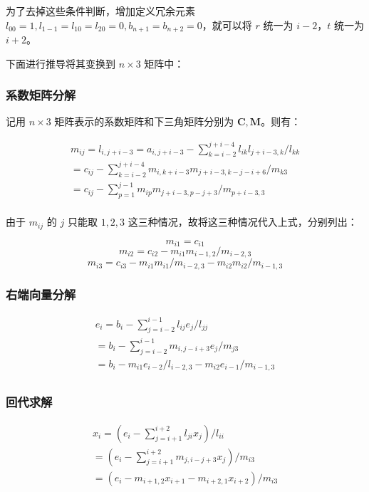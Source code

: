 \documentclass{ctexart}
\begin{document}
为了去掉这些条件判断，增加定义冗余元素 $l_{00}=1, l_{1-1}=l_{10}=l_{20}=0, b_{n+1}=b_{n+2}=0$，就可以将 $r$ 统一为 $i-2$，$t$ 统一为 $i+2$。

下面进行推导将其变换到 $n\times 3$ 矩阵中：
\subsubsection{系数矩阵分解}

记用 $n\times 3$ 矩阵表示的系数矩阵和下三角矩阵分别为 $\mathbf C,\mathbf M$。则有：

\begin{multline}
m_{ij}=l_{i,j+i-3} = a_{i,j+i-3} - \sum_{k=i-2}^{j+i-4}l_{ik}l_{j+i-3,k}/l_{kk}\\
=c_{ij}-\sum_{k=i-2}^{j+i-4}m_{i,k+i-3}m_{j+i-3,k-j-i+6}/m_{k3}\\
=c_{ij}-\sum_{p=1}^{j-1}m_{ip}m_{j+i-3,p-j+3}/m_{p+i-3,3}\\
\end{multline}

由于 $m_{ij}$ 的 $j$ 只能取 $1,2,3$ 这三种情况，故将这三种情况代入上式，分别列出：

\[
m_{i1} = c_{i1}
\]
\[
m_{i2} = c_{i2} - m_{i1}m_{i-1,2}/m_{i-2,3}
\]
\[
m_{i3} = c_{i3} - m_{i1}m_{i1}/m_{i-2,3} - m_{i2}m_{i2}/m_{i-1,3}
\]

\subsubsection{右端向量分解}

\begin{multline}
e_i=b_i-\sum_{j=i-2}^{i-1}l_{ij}e_j/l_{jj}\\
=b_i-\sum_{j=i-2}^{i-1}m_{i,j-i+3}e_j/m_{j3}\\
=b_i-m_{i1}e_{i-2}/l_{i-2,3}-m_{i2}e_{i-1}/m_{i-1,3}\\
\end{multline}

\subsubsection{回代求解}

\begin{multline}
x_i=\left(e_i-\sum_{j=i+1}^{i+2}l_{ji}x_j\right)/l_{ii}\\
=\left(e_i-\sum_{j=i+1}^{i+2}m_{j,i-j+3}x_j\right)/m_{i3}\\
=\left(e_i-m_{i+1,2}x_{i+1}-m_{i+2,1}x_{i+2}\right)/m_{i3}\\
\end{multline}
\end{document}
